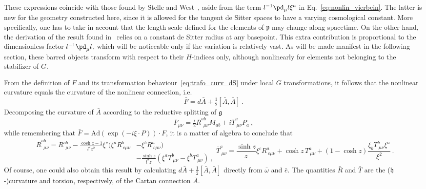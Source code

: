 \documentclass[11pt]{article}
\begin{document}
These expressions coincide with those found by Stelle and 
West~\cite{stelle.west:1980ds}, aside from the term $l^{-1} 
\pd_\mu l \xi^a$ in Eq.~\eqref{eq:nonlin_vierbein}.  The latter 
is new for the geometry constructed here, since it is allowed for 
the tangent de Sitter spaces to have a varying cosmological 
constant.  More specifically, one has to take in account that the 
length scale defined for the elements of $\mathfrak{p}$ may 
change along spacetime.  On the other hand, the derivation of the 
result found in~\cite{stelle.west:1980ds} relies on a constant de 
Sitter radius at any basepoint. This extra contribution is 
proportional to the dimensionless factor $l^{-1}\pd_\mu l$, which 
will be noticeable only if the variation is relatively vast.
As will be made manifest in the following section, these barred 
objects transform with respect to their $H$-indices only, 
although nonlinearly for elements not belonging to the stabilizer 
of $G$.

From the definition of $F$ and its transformation 
behaviour~\eqref{eq:trafo_curv_dS} under local $G$ 
transformations, it follows that the nonlinear curvature equals 
the curvature of the nonlinear connection, i.e.
%
\begin{equation}
	\bar{F} = d\bar{A} + \tfrac{1}{2}[\bar{A},\bar{A}]~.
\end{equation}
Decomposing the curvature of $\bar{A}$ according to the reductive 
splitting of $\mathfrak{g}$
%
\begin{displaymath}
	\bar{F}_{\mu\nu} = \tfrac{i}{2} \bar{R}^{ab}_{~~\mu\nu} M_{ab} 
	+ i\bar{T}^a_{~\mu\nu} P_a~,
\end{displaymath}
while remembering that $\bar{F} = \mathrm{Ad}(\exp(-i\xi\cdot 
P))\cdot F$, it is a matter of algebra to conclude that
%
\begin{subequations}
\begin{equation}
	\label{eq:Rnonlin}
\begin{split}
	\bar{R}^{ab}_{~~\mu\nu} = R^{ab}_{~~\mu\nu} - \frac{\cosh z - 
		1}{l^2z^2} \xi^c (\xi^a R^b_{~c\mu\nu} &-  \xi^b 
	R^a_{~c\mu\nu}) \\ &- \frac{\sinh z}{l^2 z} (\xi^a 
	T^b_{~\mu\nu} - \xi^b T^a_{~\mu\nu})~,
\end{split}
\end{equation}
\begin{equation}
	\label{eq:Tnonlin}
	\bar{T}^a_{~\mu\nu} = \frac{\sinh z}{z} \xi^c R^a_{~c\mu\nu} + 
	\cosh z\, T^a_{~\mu\nu} + (1 - \cosh z) \frac{\xi_b 
		T^b_{~\mu\nu}\xi^a}{\xi^2}~.
\end{equation}
\end{subequations}
Of course, one could also obtain this result by calculating 
$d\bar{A} + \tfrac{1}{2}[\bar{A},\bar{A}]$ directly from 
$\bar{\omega}$ and $\bar{e}$. The quantities $\bar{R}$ and 
$\bar{T}$ are the ($\mathfrak{h}$-)curvature and torsion, 
respectively, of the Cartan connection $\bar{A}$.
\end{document}
